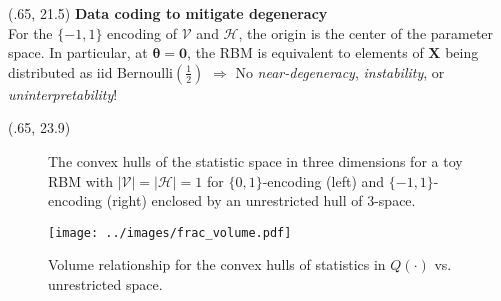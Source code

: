 \documentclass[extrafontsizes, 30pt]{memoir}
\begin{document}
\begin{textblock}{14}(.65, 21.5)
{\large \bfseries Data coding to mitigate degeneracy} \\[-.75cm]

For the $\{-1, 1 \}$ encoding of $\mathcal{V}$ and $\mathcal{H}$, the origin is the center of the parameter space. In particular, at $\boldsymbol \theta = \boldsymbol 0$, the RBM is equivalent to elements of $\boldsymbol X$ being distributed as iid Bernoulli$\left(\frac{1}{2}\right)$ $\Rightarrow$ No \emph{near-degeneracy}, \emph{instability}, or \emph{uninterpretability}!
\end{textblock}
\begin{textblock}{14.5}(.65, 23.9)
\begin{minipage}{.42\textwidth}
\begin{figure}[ht]
  \begin{minipage}{0.49\textwidth}
  \end{minipage}
  \begin{minipage}{0.49\textwidth}
  \end{minipage}
  \caption{The convex hulls of the statistic space in three dimensions for a toy RBM with $|\mathcal{V}| = |\mathcal{H}| = 1$ for $\{0,1\}$-encoding (left) and $\{-1,1\}$-encoding (right) enclosed by an unrestricted hull of 3-space.}
\label{fig:toyhull}
\end{figure}
\end{minipage}
\begin{minipage}{.02\textwidth}
\hfill
\end{minipage}
\begin{minipage}{.55\textwidth}
\begin{figure}
\centering
\texttt{[image: ../images/frac\_volume.pdf]}
\label{fig:frac_volume}
\caption{Volume relationship for the convex hulls of statistics in $Q(\cdot)$ vs. unrestricted space.}
\end{figure}
\end{minipage}

\end{textblock}
\end{document}
